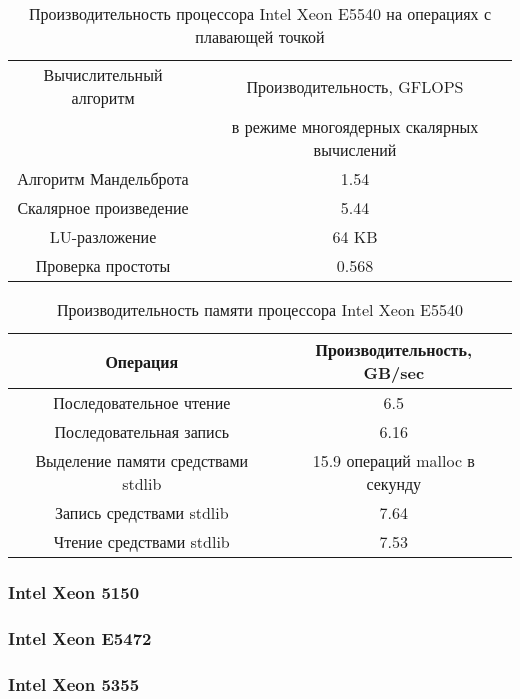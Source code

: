 \begin{table}[ht]
\begin{center}
\caption{Производительность процессора Intel Xeon  E5540 на операциях с плавающей точкой}
\begin{tabular}{|c|c|}
\hline	
Вычислительный алгоритм &  Производительность, GFLOPS \\ 
                 & в режиме многоядерных скалярных вычислений \\ \hline
Алгоритм Мандельброта  &  1.54 	\\ \hline
Скалярное произведение &  5.44   \\ \hline
LU-разложение          &  64 KB   \\ \hline
Проверка простоты      & 0.568  \\ \hline 


		\end{tabular}
	\end{center} 	
\end{table} 	

\begin{table}[ht]
	\begin{center}
		\caption{Производительность памяти процессора Intel Xeon  E5540}
		\begin{tabular}{|c|c|}
			\hline	
			Операция  &  Производительность, GB/sec \\ \hline
			Последовательное чтение &  6.5 	\\  \hline
			Последовательная запись &  6.16   \\  \hline
			Выделение памяти средствами stdlib &  15.9 операций malloc в секунду  \\  \hline
			Запись средствами stdlib  & 7.64  \\ \hline
			Чтение средствами stdlib  & 7.53  \\ \hline 
		\end{tabular}
	\end{center} 	
\end{table} 	


\subsubsection{Intel Xeon 5150}
\subsubsection{Intel Xeon E5472}
\subsubsection{Intel Xeon 5355}
